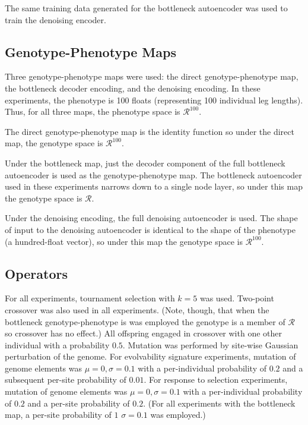 The same training data generated for the bottleneck autoencoder was used to train the denoising encoder.

\subsection{Genotype-Phenotype Maps}

Three genotype-phenotype maps were used: the direct genotype-phenotype map, the bottleneck decoder encoding, and the denoising encoding.
In these experiments, the phenotype is 100 floats (representing 100 individual leg lengths).
Thus, for all three maps, the phenotype space is $\mathcal{R}^{100}$.

The direct genotype-phenotype map is the identity function so under the direct map, the genotype space is $\mathcal{R}^{100}$.

Under the bottleneck map, just the decoder component of the full bottleneck autoencoder is used as the genotype-phenotype map.
The bottleneck autoencoder used in these experiments narrows down to a single node layer, so under this map the genotype space is $\mathcal{R}$.

Under the denoising encoding, the full denoising autoencoder is used.
The shape of input to the denoising autoencoder is identical to the shape of the phenotype (a hundred-float vector), so under this map the genotype space is $\mathcal{R}^{100}$.

\subsection{Operators}

For all experiments, tournament selection with $k = 5$ was used.
Two-point crossover was also used in all experiments.
(Note, though, that when the bottleneck genotype-phenotype is was employed the genotype is a member of $\mathcal{R}$ so crossover has no effect.)
All offspring engaged in crossover with one other individual with a probability $0.5$.
Mutation was performed by site-wise Gaussian perturbation of the genome.
For evolvability signature experiments, mutation of genome elements was $\mu=0, \sigma=0.1$ with a per-individual probability of $0.2$ and a subsequent per-site probability of $0.01$.
For response to selection experiments, mutation of genome elements was $\mu=0, \sigma=0.1$ with a per-individual probability of $0.2$ and a per-site probability of $0.2$.
(For all experiments with the bottleneck map, a per-site probability of $1$ $\sigma=0.1$ was employed.)


